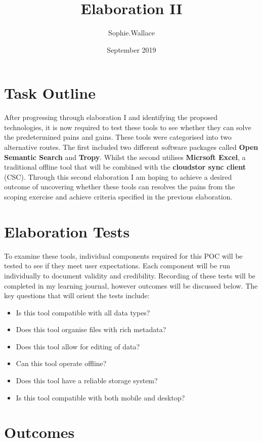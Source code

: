 \documentclass{article}
\title{Elaboration II}
\author{Sophie.Wallace }
\date{September 2019}
\begin{document}
\maketitle
\tableofcontents
\clearpage
\section{Task Outline}
After progressing through elaboration I and identifying the proposed technologies, it is now required to test these tools to see whether they can solve the predetermined pains and gains. These tools were categorised into two alternative routes. The first included two different software packages called \textbf{Open Semantic Search} and \textbf{Tropy}. Whilst the second utilises \textbf{Micrsoft Excel}, a traditional offline tool that will be combined with the \textbf{cloudstor sync client} (CSC). Through this second elaboration I am hoping to achieve a desired outcome of uncovering whether these tools can resolves the pains from the scoping exercise and achieve criteria specified in the previous elaboration.


\section{Elaboration Tests}
To examine these tools, individual components required for this POC will be tested to see if they meet user expectations. Each component will be run individually to document validity and credibility. Recording of these tests will be completed in my learning journal, however outcomes will be discussed below. The key questions that will orient the tests include:
\begin{itemize}
\item Is this tool compatible with all data types?
\item Does this tool organise files with rich metadata?
\item Does this tool allow for editing of data?
\item Can this tool operate offline?
\item Does this tool have a reliable storage system?
\item Is this tool compatible with both mobile and desktop?
\end{itemize}
\clearpage
\section{Outcomes}
\end{document}
